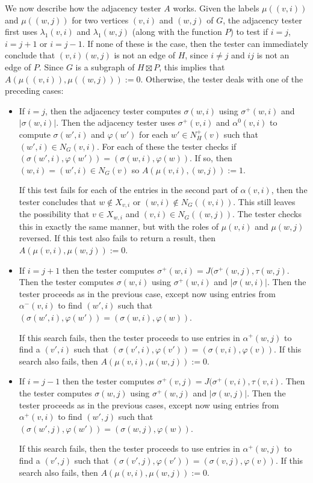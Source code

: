 \documentclass{patmorin}
\begin{document}
  We now describe how the adjacency tester $A$ works.
  Given the labels $\mu((v,i))$ and $\mu((w,j))$ for two vertices $(v,i)$ and $(w,j)$ of $G$, the adjacency tester first uses $\lambda_1(v,i)$ and $\lambda_1(w,j)$ (along with the function $P$) to test if $i=j$, $i=j+1$ or $i=j-1$.  If none of these is the case, then the tester can immediately conclude that $(v,i)(w,j)$ is not an edge of $H$, since $i\neq j$ and $ij$ is not an edge of $P$.  Since $G$ is a subgraph of $H\boxtimes P$, this implies that $A(\mu((v,i)),\mu((w,j))):=0$.  Otherwise, the tester deals with one of the preceding cases:
  \begin{itemize}
    \item If $i=j$, then the adjacency tester computes $\sigma(w,i)$ using $\sigma^+(w,i)$ and $|\sigma(w,i)|$.  Then the adjacency tester uses $\sigma^+(v,i)$ and $\alpha^0(v,i)$ to compute $\sigma(w',i)$ and $\varphi(w')$ for each $w'\in N^+_H(v)$ such that $(w',i)\in N_G(v,i)$.  For each of these the tester checks if $(\sigma(w',i),\varphi(w'))=(\sigma(w,i),\varphi(w))$. If so, then $(w,i)=(w',i)\in N_G(v)$ so $A(\mu(v,i),(w,j)):=1$.

    If this test fails for each of the entries in the second part of $\alpha(v,i)$, then the tester concludes that $w\not\in X_{v,i}$ or $(w,i)\not\in N_G((v,i))$.  This still leaves the possibility that $v\in X_{w,i}$ and $(v,i)\in N_G((w,j))$.  The tester checks this in exactly the same manner, but with the roles of $\mu(v,i)$ and $\mu(w,j)$ reversed.  If this test also fails to return a result, then $A(\mu(v,i),\mu(w,j)):=0$.

    \item If $i=j+1$ then the tester computes $\sigma^+(w,i)=J(\sigma^+(w,j),\tau(w,j)$. Then the tester computes $\sigma(w,i)$ using $\sigma^+(w,i)$ and $|\sigma(w,i)|$.
    Then the tester proceeds as in the previous case, except now using entries from $\alpha^-(v,i)$ to find $(w',i)$ such that $(\sigma(w',i),\varphi(w'))=(\sigma(w,i),\varphi(w))$.

    If this search fails, then the tester proceeds to use entries in $\alpha^+(w,j)$ to find a $(v',i)$ such that $(\sigma(v',i),\varphi(v'))=(\sigma(v,i),\varphi(v))$.  If this search also fails, then $A(\mu(v,i),\mu(w,j)):=0$.

    \item If $i=j-1$ then the tester computes $\sigma^+(v,j)=J(\sigma^+(v,i),\tau(v,i)$. Then the tester computes $\sigma(w,j)$ using $\sigma^+(w,j)$ and $|\sigma(w,j)|$.
    Then the tester proceeds as in the previous cases, except now using entries from $\alpha^+(v,i)$ to find $(w',j)$ such that $(\sigma(w',j),\varphi(w'))=(\sigma(w,j),\varphi(w))$.

    If this search fails, then the tester proceeds to use entries in $\alpha^+(w,j)$ to find a $(v',j)$ such that $(\sigma(v',j),\varphi(v'))=(\sigma(v,j),\varphi(v))$.  If this search also fails, then $A(\mu(v,i),\mu(w,j)):=0$.
  \end{itemize}
\end{document}
